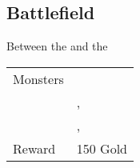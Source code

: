 \subsection{Battlefield}
\label{map:battlefield_03}

Between the  and the 

\begin{longtable}{ l p{9cm} }
	Monsters
	& \nameref{monster:minotar_zombie} \\
	& \nameref{monster:minotar_zombie}, \nameref{monster:basilisk} \\
	& \nameref{monster:sand_worm}, \nameref{monster:sand_worm}
\\
	Reward & 150 Gold
\end{longtable}
